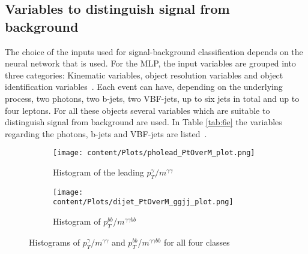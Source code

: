 \subsection{Variables to distinguish signal from background}
\label{sec:trainvar}

The choice of the inputs used for signal-background classification depends on the neural network that is used. For the MLP, the input variables are grouped into three
categories: Kinematic variables, object resolution variables and object identification variables~\cite{CMS:2021qbp}. Each event can have, depending on the underlying process, two photons, two b-jets,
two VBF-jets, up to six jets in total and up to four leptons. For all these objects several variables which are suitable to distinguish signal from background are used.
In Table \ref{tab:6e} the variables regarding the photons, b-jets and VBF-jets are listed~\cite{Run2analysisnote}.


\begin{figure}[H]
    \centering
    \begin{subfigure}{0.45\textwidth}
        \centering
        \texttt{[image: content/Plots/pholead\_PtOverM\_plot.png]}
        \caption{Histogram of the leading $p_T^{\gamma}/m^{\gamma \gamma}$}
        \label{fig:roc1}
    \end{subfigure}
    \hfill
    \begin{subfigure}{0.45\textwidth}
        \centering
        \texttt{[image: content/Plots/dijet\_PtOverM\_ggjj\_plot.png]}
        \caption{Histogram of $p_T^{bb}$/$m^{\gamma \gamma bb}$}
        \label{fig:roc2}
    \end{subfigure}
    \caption{Histograms of $p_T^{\gamma}/m^{\gamma \gamma}$ and $p_T^{bb}$/$m^{\gamma \gamma bb}$ for all four classes}
    \label{fig:18}
\end{figure}

